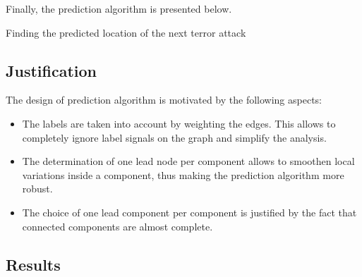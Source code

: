 Finally, the prediction algorithm is presented below. 

\begin{algorithm}[H]
\vspace{-.5em}

 
 \caption{Finding the predicted location of the next terror attack}
\end{algorithm}

\subsection{Justification}
\label{subsec:Justification}
The design of prediction algorithm is motivated by the following aspects:
\begin{itemize}
\item The labels are taken into account by weighting the edges. This allows to completely ignore label signals on the graph and simplify the analysis.
\item The determination of one lead node per component allows to smoothen local variations inside a component, thus making the prediction algorithm more robust.
\item The choice of one lead component per component is justified by the fact that connected components are almost complete.
\end{itemize}

\subsection{Results}
\label{subsec:Results}

